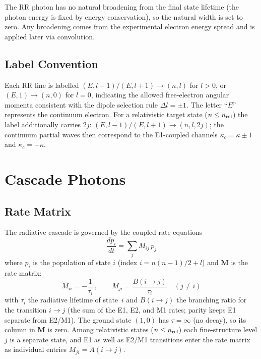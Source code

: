 \documentclass[11pt,a4paper]{article}
\newcommand{\bM}{\boldsymbol{M}}
\begin{document}
The RR photon has no natural broadening from the final state lifetime
(the photon energy is fixed by energy conservation), so the natural
width is set to zero.  Any broadening comes from the experimental
electron energy spread and is applied later via convolution.

\subsection{Label Convention}

Each RR line is labelled $(E,l{-}1)/(E,l{+}1) \to (n,l)$ for $l > 0$,
or $(E,1) \to (n,0)$ for $l = 0$, indicating the allowed free-electron
angular momenta consistent with the dipole selection rule $\Delta l =
\pm 1$.  The letter ``$E$'' represents the continuum electron.  For a
relativistic target state ($n \le n_{\rm rel}$) the label additionally
carries $2j$: $(E,l{-}1)/(E,l{+}1) \to (n,l,2j)$; the continuum
partial waves then correspond to the E1-coupled channels
$\kappa_c = \kappa \pm 1$ and $\kappa_c = -\kappa$.

\section{Cascade Photons}

\subsection{Rate Matrix}

The radiative cascade is governed by the coupled rate equations
\begin{equation}
  \frac{d p_i}{dt} = \sum_j M_{ij}\, p_j
  \label{eq:rate}
\end{equation}
where $p_i$ is the population of state $i$ (index $i = n(n{-}1)/2 + l$)
and $\bM$ is the rate matrix:
\begin{equation}
  M_{ii} = -\frac{1}{\tau_i}\,, \qquad
  M_{ji} = \frac{B(i \to j)}{\tau_i} \quad (j \ne i)
  \label{eq:M}
\end{equation}
with $\tau_i$ the radiative lifetime of state~$i$ and $B(i \to j)$ the
branching ratio for the transition $i \to j$ (the sum of the E1, E2,
and M1 rates; parity keeps E1 separate from E2/M1).  The ground state
$(1,0)$ has $\tau = \infty$ (no decay), so its column in $\bM$ is zero.
Among relativistic states ($n \le n_{\rm rel}$) each fine-structure
level $j$ is a separate state, and E1 as well as E2/M1 transitions
enter the rate matrix as individual entries $M_{ji} = A(i\to j)$.
\end{document}
